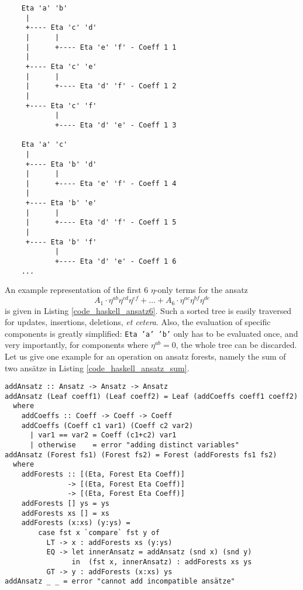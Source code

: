 \begin{code}
  \begin{verbatim}
    Eta 'a' 'b'
     |
     +---- Eta 'c' 'd'
     |      |
     |      +---- Eta 'e' 'f' - Coeff 1 1
     |
     +---- Eta 'c' 'e'
     |      |
     |      +---- Eta 'd' 'f' - Coeff 1 2
     |
     +---- Eta 'c' 'f'
            |
            +---- Eta 'd' 'e' - Coeff 1 3

    Eta 'a' 'c'
     |
     +---- Eta 'b' 'd'
     |      |
     |      +---- Eta 'e' 'f' - Coeff 1 4
     |
     +---- Eta 'b' 'e'
     |      |
     |      +---- Eta 'd' 'f' - Coeff 1 5
     |
     +---- Eta 'b' 'f'
            |
            +---- Eta 'd' 'e' - Coeff 1 6
    ...
  \end{verbatim}
  \label{code_haskell_ansatz6}
\end{code}
An example representation of the first 6 $\eta$-only terms for the ansatz
\begin{equation}
  A_1 \cdot \eta^{ab} \eta^{cd} \eta^{ef} + \dots + A_6 \cdot \eta^{ac} \eta^{bf} \eta^{de}
\end{equation}
is given in Listing \ref{code_haskell_ansatz6}. Such a sorted tree is easily traversed for updates, insertions, deletions, \emph{et cetera}. Also, the evaluation of specific components is greatly simplified: \texttt{Eta 'a' 'b'} only has to be evaluated once, and very importantly, for components where $\eta^{ab} = 0$, the whole tree can be discarded. Let us give one example for an operation on ansatz forests, namely the sum of two ansätze in Listing \ref{code_haskell_ansatz_sum}.
\begin{code}
  \begin{verbatim}
addAnsatz :: Ansatz -> Ansatz -> Ansatz
addAnsatz (Leaf coeff1) (Leaf coeff2) = Leaf (addCoeffs coeff1 coeff2)
  where
    addCoeffs :: Coeff -> Coeff -> Coeff
    addCoeffs (Coeff c1 var1) (Coeff c2 var2)
      | var1 == var2 = Coeff (c1+c2) var1
      | otherwise    = error "adding distinct variables"
addAnsatz (Forest fs1) (Forest fs2) = Forest (addForests fs1 fs2)
  where
    addForests :: [(Eta, Forest Eta Coeff)]
               -> [(Eta, Forest Eta Coeff)]
               -> [(Eta, Forest Eta Coeff)]
    addForests [] ys = ys
    addForests xs [] = xs
    addForests (x:xs) (y:ys) =
        case fst x `compare` fst y of
          LT -> x : addForests xs (y:ys)
          EQ -> let innerAnsatz = addAnsatz (snd x) (snd y)
                in  (fst x, innerAnsatz) : addForests xs ys
          GT -> y : addForests (x:xs) ys
addAnsatz _ _ = error "cannot add incompatible ansätze"
  \end{verbatim}
  \label{code_haskell_ansatz_sum}
\end{code}
